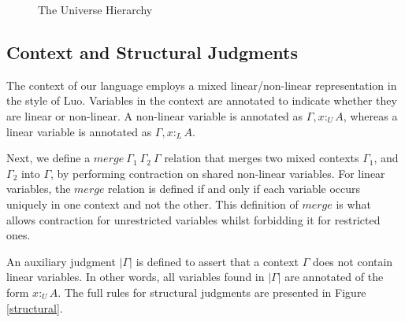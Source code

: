 \documentclass[sigplan,screen,review,anonymous]{acmart}
\newcommand{\pure}[1]{|#1|}
\newcommand{\utype}{:_{\scriptscriptstyle U}}
\newcommand{\ltype}{:_{\scriptscriptstyle L}}
\newcommand{\mrg}[3]{merge\ {#1}\ {#2}\ {#3}}
\begin{document}
\begin{figure}[h]
  \caption{The Universe Hierarchy}
  \vspace{1em}
  \centering
  \label{universe}
  \Description{}
\end{figure}

\subsection{Context and Structural Judgments}
The context of our language employs a mixed linear/non-linear representation in the style of Luo\cite{luo}. Variables in the context are annotated to indicate whether they are linear or non-linear. A non-linear variable is annotated as $\Gamma, x \utype A$, whereas a linear variable is annotated as $\Gamma, x \ltype A$.

Next, we define a $\mrg{\Gamma_1}{\Gamma_2}{\Gamma}$ relation that merges two mixed contexts $\Gamma_1$, and $\Gamma_2$ into $\Gamma$, by performing contraction on shared non-linear variables. For linear variables, the $merge$ relation is defined if and only if each variable occurs uniquely in one context and not the other. This definition of $merge$ is what allows contraction for unrestricted variables whilst forbidding it for restricted ones.

An auxiliary judgment $\pure{\Gamma}$ is defined to assert that a context $\Gamma$ does not contain linear variables. In other words, all variables found in $\pure{\Gamma}$ are annotated of the form $x \utype A$. The full rules for structural judgments are presented in Figure \ref{structural}.
\end{document}
